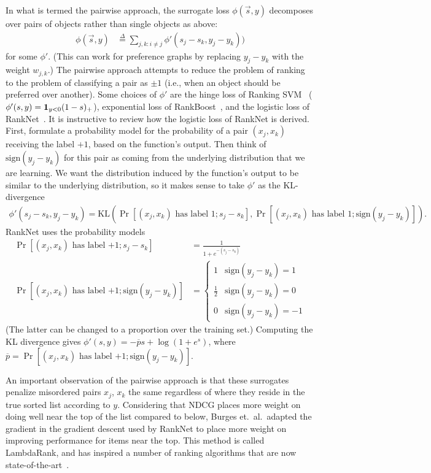 In what is termed the pairwise approach, the surrogate loss
$\phi(\vec{s}, y)$ decomposes over pairs of objects rather than single objects
as above:
\begin{align*}
  \phi(\vec{s}, y)
  &\stackrel{\Delta}{=}
  \sum_{j,k : i \neq j} \phi'(s_j - s_k, y_j - y_k))
\end{align*}
for some $\phi'$. (This can work for preference graphs by replacing $y_j - y_k$
with the weight $w_{j,k}$.)
The pairwise approach attempts to reduce the problem of
ranking to the problem of classifying a pair as $\pm 1$ (i.e.,
when an object should be preferred over another). Some choices of $\phi'$
are the hinge loss of Ranking SVM~\cite{Herbrich99rankingsvm}
($\phi'(s, y) = {\mathbf 1}_{y < 0}(1 - s)_+$),
exponential loss of RankBoost~\cite{Freund98rankboost},
and the logistic loss of RankNet~\cite{Burges05ranknet}.
It is instructive to review how the logistic loss of RankNet is derived.
First, formulate a probability model for the probability
of a pair $(x_j, x_k)$ receiving the label $+1$, based on the function's
output. Then think of $\text{sign}(y_j - y_k)$
for this pair as coming from the underlying distribution that we are learning.
We want the distribution induced by the function's output to be similar to the
underlying distribution, so it makes sense to take $\phi'$ as the KL-divergence
\begin{align*}
  \phi'(s_j - s_k, y_j - y_k)
  = \text{KL}(\Pr[\text{$(x_j, x_k)$ has label $1$} ; s_j - s_k], \Pr[\text{$(x_j, x_k)$ has label $1$} ; \text{sign}(y_j - y_k)]).
\end{align*}
RankNet uses the probability models
\begin{align*}
  \Pr[\text{$(x_j, x_k)$ has label $+1$}; s_j - s_k] &= \frac{1}{1 + e^{-(s_j - s_k)}} \\
  \Pr[\text{$(x_j, x_k)$ has label $+1$} ; \text{sign}(y_j - y_k)] &=
  \begin{cases}
    1 & \text{sign}(y_j - y_k) = 1 \\
    \frac{1}{2} & \text{sign}(y_j - y_k) = 0 \\
    0 & \text{sign}(y_j - y_k) = -1
  \end{cases}
\end{align*}
(The latter can be changed to a proportion over the training set.)
Computing the KL divergence gives $\phi'(s, y) = -\overline{p} s + \log(1 + e^s)$,
where
$\overline{p} = \Pr[\text{$(x_j, x_k)$ has label $+1$} ; \text{sign}(y_j - y_k)]$. 

An important observation of the pairwise approach is that these surrogates
penalize misordered pairs $x_j$, $x_k$ the same regardless of where they
reside in the true sorted list according to $y$. 
Considering that NDCG places more weight on doing well near the top of the list
compared to below, Burges et.\ al.\ adapted the gradient in the gradient descent
used by RankNet to place more weight on improving performance for items near
the top. This method is called LambdaRank, and has inspired a number of
ranking algorithms that are now state-of-the-art~\cite{cross-benchmark}.

